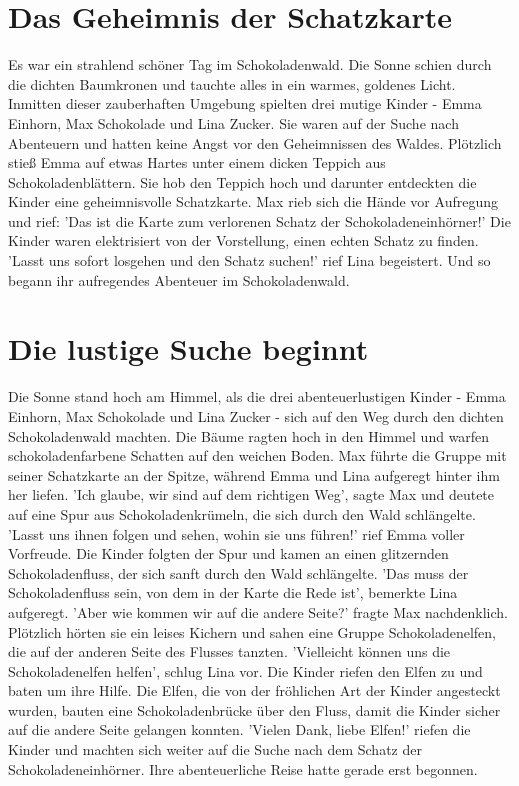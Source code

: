 \documentclass[12pt]{article} %
\begin{document}
\clearpage
\tableofcontents
\clearpage


\section{ Das Geheimnis der Schatzkarte }
\begin{minipage}{\textwidth}
    Es war ein strahlend schöner Tag im Schokoladenwald. Die Sonne schien durch die dichten Baumkronen und tauchte alles in ein warmes, goldenes Licht. Inmitten dieser zauberhaften Umgebung spielten drei mutige Kinder - Emma Einhorn, Max Schokolade und Lina Zucker. Sie waren auf der Suche nach Abenteuern und hatten keine Angst vor den Geheimnissen des Waldes. Plötzlich stieß Emma auf etwas Hartes unter einem dicken Teppich aus Schokoladenblättern. Sie hob den Teppich hoch und darunter entdeckten die Kinder eine geheimnisvolle Schatzkarte. Max rieb sich die Hände vor Aufregung und rief: 'Das ist die Karte zum verlorenen Schatz der Schokoladeneinhörner!' Die Kinder waren elektrisiert von der Vorstellung, einen echten Schatz zu finden. 'Lasst uns sofort losgehen und den Schatz suchen!' rief Lina begeistert. Und so begann ihr aufregendes Abenteuer im Schokoladenwald.
\end{minipage}

\section{ Die lustige Suche beginnt }
\begin{minipage}{\textwidth}
    Die Sonne stand hoch am Himmel, als die drei abenteuerlustigen Kinder - Emma Einhorn, Max Schokolade und Lina Zucker - sich auf den Weg durch den dichten Schokoladenwald machten. Die Bäume ragten hoch in den Himmel und warfen schokoladenfarbene Schatten auf den weichen Boden. Max führte die Gruppe mit seiner Schatzkarte an der Spitze, während Emma und Lina aufgeregt hinter ihm her liefen. 'Ich glaube, wir sind auf dem richtigen Weg', sagte Max und deutete auf eine Spur aus Schokoladenkrümeln, die sich durch den Wald schlängelte. 'Lasst uns ihnen folgen und sehen, wohin sie uns führen!' rief Emma voller Vorfreude. Die Kinder folgten der Spur und kamen an einen glitzernden Schokoladenfluss, der sich sanft durch den Wald schlängelte. 'Das muss der Schokoladenfluss sein, von dem in der Karte die Rede ist', bemerkte Lina aufgeregt. 'Aber wie kommen wir auf die andere Seite?' fragte Max nachdenklich. Plötzlich hörten sie ein leises Kichern und sahen eine Gruppe Schokoladenelfen, die auf der anderen Seite des Flusses tanzten. 'Vielleicht können uns die Schokoladenelfen helfen', schlug Lina vor. Die Kinder riefen den Elfen zu und baten um ihre Hilfe. Die Elfen, die von der fröhlichen Art der Kinder angesteckt wurden, bauten eine Schokoladenbrücke über den Fluss, damit die Kinder sicher auf die andere Seite gelangen konnten. 'Vielen Dank, liebe Elfen!' riefen die Kinder und machten sich weiter auf die Suche nach dem Schatz der Schokoladeneinhörner. Ihre abenteuerliche Reise hatte gerade erst begonnen.
\end{minipage}
\end{document}
